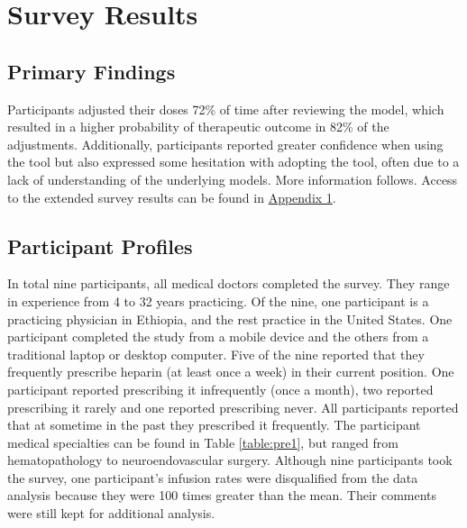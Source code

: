 \documentclass[12pt,a4paper,]{report}
\begin{document}
\chapter{Survey Results}\label{survey-results}

\section{Primary Findings}\label{primary-findings}

Participants adjusted their doses 72\% of time after reviewing the
model, which resulted in a higher probability of therapeutic outcome in
82\% of the adjustments. Additionally, participants reported greater
confidence when using the tool but also expressed some hesitation with
adopting the tool, often due to a lack of understanding of the
underlying models. More information follows. Access to the extended
survey results can be found in
\protect\hyperlink{appendix-1-full-survey-results}{Appendix 1}.

\section{Participant Profiles}\label{participant-profiles}

In total nine participants, all medical doctors completed the survey.
They range in experience from 4 to 32 years practicing. Of the nine, one
participant is a practicing physician in Ethiopia, and the rest practice
in the United States. One participant completed the study from a mobile
device and the others from a traditional laptop or desktop computer.
Five of the nine reported that they frequently prescribe heparin (at
least once a week) in their current position. One participant reported
prescribing it infrequently (once a month), two reported prescribing it
rarely and one reported prescribing never. All participants reported
that at sometime in the past they prescribed it frequently. The
participant medical specialties can be found in Table \ref{table:pre1},
but ranged from hematopathology to neuroendovascular surgery. Although
nine participants took the survey, one participant's infusion rates were
disqualified from the data analysis because they were 100 times greater
than the mean. Their comments were still kept for additional analysis.
\end{document}
